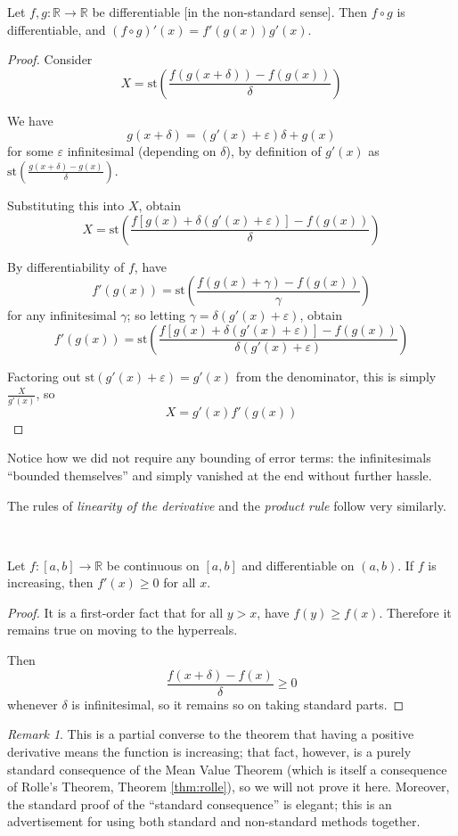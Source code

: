\documentclass[11pt]{amsart}
\theoremstyle{remark}
\newtheorem*{remark}{Remark}
\newcommand{\st}{\mathrm{st}}
\begin{document}
\begin{thm}
Let $f, g: \mathbb{R} \to \mathbb{R}$ be differentiable [in the non-standard sense]. Then $f \circ g$ is differentiable, and $(f \circ g)'(x) = f'(g(x)) g'(x)$.
\end{thm}
\begin{proof}
Consider $$X = \st \left( \frac{f(g(x+\delta)) - f(g(x))}{\delta} \right)$$

We have $$g(x+\delta) = (g'(x) + \varepsilon) \delta + g(x)$$
for some $\varepsilon$ infinitesimal (depending on $\delta$), by definition of $g'(x)$ as $\st \left( \frac{g(x+\delta) - g(x)}{\delta} \right)$.

Substituting this into $X$, obtain $$X = \st \left( \frac{f[g(x) + \delta (g'(x) + \varepsilon)] - f(g(x))}{\delta} \right)$$

By differentiability of $f$, have $$f'(g(x)) = \st \left( \frac{f(g(x) + \gamma) - f(g(x))}{\gamma} \right)$$
for any infinitesimal $\gamma$; so letting $\gamma = \delta (g'(x) + \varepsilon)$, obtain
$$f'(g(x)) = \st \left( \frac{f[g(x) + \delta (g'(x) + \varepsilon)]-f(g(x))}{\delta (g'(x) + \varepsilon)} \right)$$

Factoring out $\st(g'(x) + \varepsilon) = g'(x)$ from the denominator, this is simply $\frac{X}{g'(x)}$, so $$X = g'(x) f'(g(x))$$

\end{proof}

Notice how we did not require any bounding of error terms: the infinitesimals ``bounded themselves'' and simply vanished at the end without further hassle.

The rules of \emph{linearity of the derivative} and the \emph{product rule} follow very similarly.

\

\begin{thm} \label{thm:increasingimpliesderivativepositive} Let $f: [a,b] \to \mathbb{R}$ be continuous on $[a,b]$ and differentiable on $(a,b)$.
If $f$ is increasing, then $f'(x) \geq 0$ for all $x$.
\end{thm}
\begin{proof}
It is a first-order fact that for all $y > x$, have $f(y) \geq f(x)$.
Therefore it remains true on moving to the hyperreals.

Then $$\frac{f(x+\delta) - f(x)}{\delta} \geq 0$$ whenever $\delta$ is infinitesimal, so it remains so on taking standard parts.
\end{proof}
\begin{remark}
This is a partial converse to the theorem that having a positive derivative means the function is increasing; that fact, however, is a purely standard consequence of the Mean Value Theorem (which is itself a consequence of Rolle's Theorem, Theorem \ref{thm:rolle}), so we will not prove it here.
Moreover, the standard proof of the ``standard consequence'' is elegant; this is an advertisement for using both standard and non-standard methods together.
\end{remark}
\end{document}
